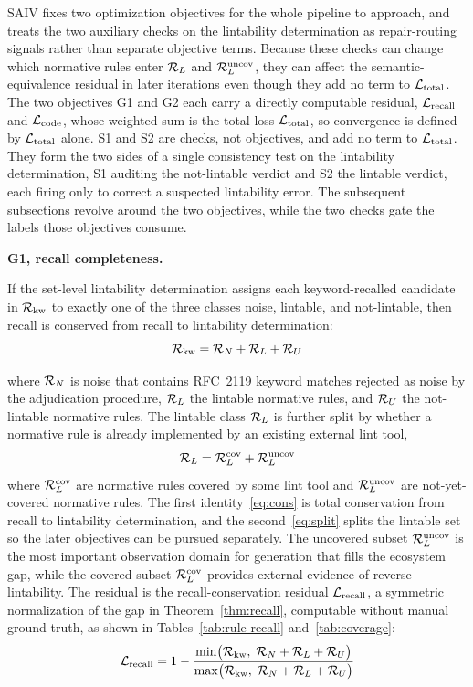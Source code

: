 SAIV fixes two optimization objectives
for the whole pipeline to approach, and treats the two auxiliary checks
on the lintability determination as repair-routing signals rather than
separate objective terms. Because these checks can change which normative rules enter
$\mathcal{R}_L$ and $\mathcal{R}_L^{\mathrm{uncov}}$, they can affect the semantic-equivalence residual in later iterations
even though they add no term to $\mathcal{L}_{\mathrm{total}}$. The two objectives G1 and G2 each carry
a directly computable residual, $\mathcal{L}_{\mathrm{recall}}$ and $\mathcal{L}_{\mathrm{code}}$, whose weighted sum is the
total loss $\mathcal{L}_{\mathrm{total}}$, so convergence is defined by $\mathcal{L}_{\mathrm{total}}$ alone. S1 and S2 are
checks, not objectives, and add no term to $\mathcal{L}_{\mathrm{total}}$. They form the two sides of a
single consistency test on the lintability determination, S1 auditing the
not-lintable verdict and S2
the lintable verdict, each firing only to correct a suspected lintability error.
The subsequent subsections revolve around the two objectives, while the two
checks gate the labels those objectives consume.

\noindent\textbf{G1, recall completeness.}
\begin{theorem}\label{thm:recall}
If the set-level lintability determination assigns each keyword-recalled candidate in
$\mathcal{R}_{\mathrm{kw}}$ to exactly one of the three classes noise, lintable, and
not-lintable, then recall is conserved from recall to lintability
determination:
\begin{equation}\label{eq:cons}
  \mathcal{R}_{\mathrm{kw}} = \mathcal{R}_N + \mathcal{R}_L + \mathcal{R}_U
\end{equation}
\end{theorem}
\noindent where $\mathcal{R}_N$ is noise that contains
RFC~2119 keyword matches rejected as noise by the adjudication procedure,
$\mathcal{R}_L$ the lintable normative rules, and $\mathcal{R}_U$
the not-lintable normative rules. The lintable class $\mathcal{R}_L$ is further split by whether
a normative rule is already implemented by an existing external lint tool,
\begin{equation}\label{eq:split}
  \mathcal{R}_L = \mathcal{R}_L^{\mathrm{cov}} + \mathcal{R}_L^{\mathrm{uncov}}
\end{equation}
where $\mathcal{R}_L^{\mathrm{cov}}$ are normative rules covered by some lint tool and $\mathcal{R}_L^{\mathrm{uncov}}$ are
not-yet-covered normative rules. The first identity~\eqref{eq:cons} is total conservation
from recall to lintability determination, and the second~\eqref{eq:split} splits the
lintable set so the later objectives can be pursued separately. The uncovered
subset $\mathcal{R}_L^{\mathrm{uncov}}$ is the most important observation domain for generation that
fills the ecosystem gap, while the covered subset $\mathcal{R}_L^{\mathrm{cov}}$ provides external
evidence of reverse lintability. The residual is the recall-conservation
residual $\mathcal{L}_{\mathrm{recall}}$, a symmetric normalization of the gap in
Theorem~\ref{thm:recall}, computable without manual ground truth, as shown in Tables~\ref{tab:rule-recall} and~\ref{tab:coverage}:
\begin{equation}\label{eq:recall-res}
  \mathcal{L}_{\mathrm{recall}} = 1 - \frac{\min\!\big(\mathcal{R}_{\mathrm{kw}},\; \mathcal{R}_N+\mathcal{R}_L+\mathcal{R}_U\big)}
  {\max\!\big(\mathcal{R}_{\mathrm{kw}},\; \mathcal{R}_N+\mathcal{R}_L+\mathcal{R}_U\big)}
\end{equation}

